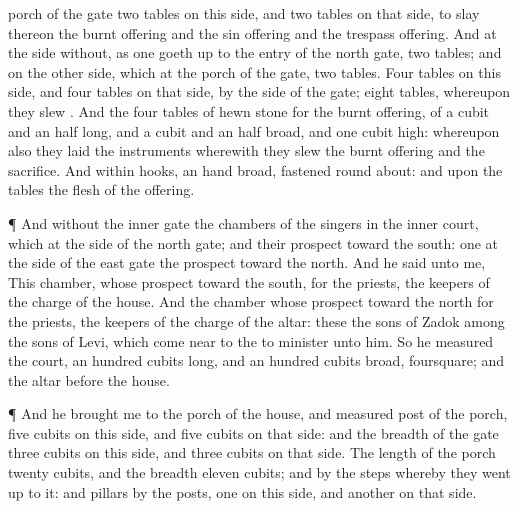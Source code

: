 {porch of the
gate
{}
two
tables on this side, and two
tables on that side, to
slay thereon the burnt
offering and the sin
offering and the trespass
offering.
And at the
side
without, as one goeth
up to the
entry of the
north
gate,
{}
two
tables; and on the
other
side, which
{} at the
porch of the
gate,
{}
two
tables.
Four
tables
{} on this side, and
four
tables on that side, by the
side of the
gate;
eight
tables, whereupon they
slew
{}.
And the
four
tables
{} of
hewn
stone for the burnt
offering, of a
cubit and an
half
long, and a
cubit and an
half
broad, and
one
cubit
high: whereupon also they
laid the
instruments wherewith they
slew the burnt
offering and the
sacrifice.
And
within
{}
hooks,
an
hand broad,
fastened round
about: and upon the
tables
{} the
flesh of the
offering.
\par }{\PP {}¶ And
without the
inner
gate
{} the
chambers of the
singers in the
inner
court, which
{} at the
side of the
north
gate; and their
prospect
{}
toward the
south:
one at the
side of the
east
gate
{} the
prospect
toward the
north.
And he
said unto me,
This
chamber, whose
prospect
{}
toward the
south,
{} for the
priests, the
keepers of the
charge of the
house.
And the
chamber whose
prospect
{}
toward the
north
{} for the
priests, the
keepers of the
charge of the
altar: these
{} the
sons of
Zadok among the
sons of
Levi, which come
near to the
{} to
minister unto him.
So he
measured the
court, an
hundred
cubits
long, and an
hundred
cubits
broad,
foursquare; and the
altar
{}
before the
house.
\par }{\PP {}¶ And he
brought me to the
porch of the
house, and
measured
{}
post of the
porch,
five
cubits on this side, and
five
cubits on that side: and the
breadth of the
gate
{}
three
cubits on this side, and
three
cubits on that side.
The
length of the
porch
{}
twenty
cubits, and the
breadth
eleven
cubits; and
{} by the
steps whereby they went
up to it: and
{}
pillars by the
posts,
one on this side, and
another on that side.

}
